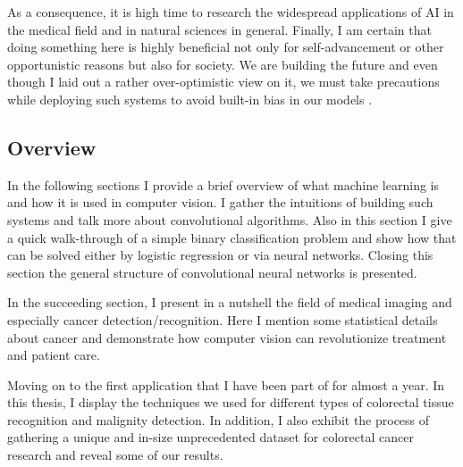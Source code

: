 \documentclass[a4paper,12pt]{article}
\begin{document}
\vspace{4mm}

\par As a consequence, it is high time to research the widespread applications of AI in the medical field and in natural sciences in general. Finally, I am certain that doing something here is highly beneficial not only for self-advancement or other opportunistic reasons but also for society. We are building the future and even though I laid out a rather over-optimistic view on it, we must take precautions while deploying such systems to avoid built-in bias in our models \cite{amodei2016concrete}.

\newpage

\subsection{Overview}

\vspace{7mm}

\par In the following sections I provide a brief overview of what machine learning is and how it is used in computer vision. I gather the intuitions of building such systems and talk more about convolutional algorithms. Also in this section I give a quick walk-through of a simple binary classification problem and show how that can be solved either by logistic regression or via neural networks. Closing this section the general structure of convolutional neural networks is presented.

\vspace{4mm}

\par In the succeeding section, I present in a nutshell the field of medical imaging and especially cancer detection/recognition. Here I mention some statistical details about cancer and demonstrate how computer vision can revolutionize treatment and patient care.

\vspace{4mm}

\par Moving on to the first application that I have been part of for almost a year. In this thesis, I display the techniques we used for different types of colorectal tissue recognition and malignity detection. In addition, I also exhibit the process of gathering a unique and in-size unprecedented dataset for colorectal cancer research and reveal some of our results.

\vspace{4mm}
\end{document}
